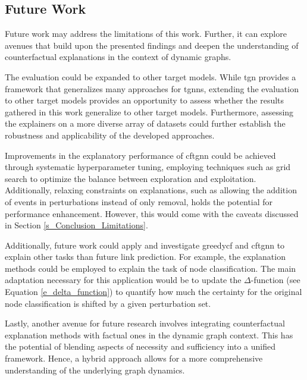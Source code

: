 \subsection{Future Work}
\label{s_Conclusion_FutureWork}

Future work may address the limitations of this work. Further, it can explore avenues that build upon the presented findings and deepen the understanding of counterfactual explanations in the context of dynamic graphs. 

The evaluation could be expanded to other target models. While \gls{tgn} provides a framework that generalizes many approaches for \glspl{tgnn}, extending the evaluation to other target models provides an opportunity to assess whether the results gathered in this work generalize to other target models. Furthermore, assessing the explainers on a more diverse array of datasets could further establish the robustness and applicability of the developed approaches.

Improvements in the explanatory performance of \gls{cftgnn} could be achieved through systematic hyperparameter tuning, employing techniques such as grid search to optimize the balance between exploration and exploitation. 
Additionally, relaxing constraints on explanations, such as allowing the addition of events in perturbations instead of only removal, holds the potential for performance enhancement. However, this would come with the caveats discussed in Section \ref{s_Conclusion_Limitations}.

Additionally, future work could apply and investigate \gls{greedycf} and \gls{cftgnn} to explain other tasks than future link prediction. For example, the explanation methods could be employed to explain the task of node classification. The main adaptation necessary for this application would be to update the $\Delta$-function (see Equation \ref{e_delta_function}) to quantify how much the certainty for the original node classification is shifted by a given perturbation set.


Lastly, another avenue for future research involves integrating counterfactual explanation methods with factual ones in the dynamic graph context. This has the potential of blending aspects of necessity and sufficiency into a unified framework. Hence, a hybrid approach allows for a more comprehensive understanding of the underlying graph dynamics.


